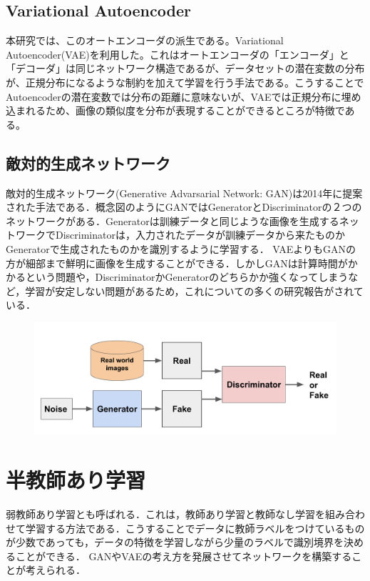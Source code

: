 \subsection{Variational Autoencoder}
本研究では、このオートエンコーダの派生である。Variational Autoencoder(VAE)を利用した。これはオートエンコーダの「エンコーダ」と「デコーダ」は同じネットワーク構造であるが、データセットの潜在変数の分布が、正規分布になるような制約を加えて学習を行う手法である。こうすることでAutoencoderの潜在変数では分布の距離に意味ないが、VAEでは正規分布に埋め込まれるため、画像の類似度を分布が表現することができるところが特徴である。

\subsection{敵対的生成ネットワーク}
敵対的生成ネットワーク(Generative Advarsarial Network: GAN)は2014年に提案された手法である．概念図のようにGANではGeneratorとDiscriminatorの２つのネットワークがある．Generatorは訓練データと同じような画像を生成するネットワークでDiscriminatorは，入力されたデータが訓練データから来たものかGeneratorで生成されたものかを識別するように学習する．
VAEよりもGANの方が細部まで鮮明に画像を生成することができる．しかしGANは計算時間がかかるという問題や，DiscriminatorかGeneratorのどちらかか強くなってしまうなど，学習が安定しない問題があるため，これについての多くの研究報告がされている．

\begin{figure}[h]
\centering
\includegraphics[width=0.7\linewidth]{fig/generative_adversarial_nets.png}
\caption{}
\label{fig:}
\end{figure}

\section{半教師あり学習}
弱教師あり学習とも呼ばれる．これは，教師あり学習と教師なし学習を組み合わせて学習する方法である．こうすることでデータに教師ラベルをつけているものが少数であっても，データの特徴を学習しながら少量のラベルで識別境界を決めることができる．
GANやVAEの考え方を発展させてネットワークを構築することが考えられる．
